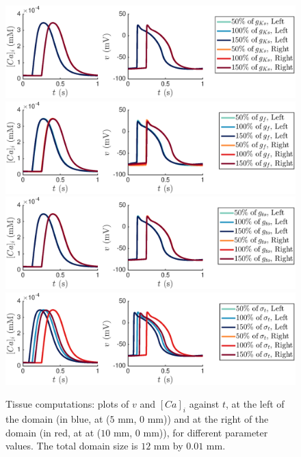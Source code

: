 \documentclass{article}
\begin{document}
%
\begin{figure}
   \includegraphics[trim=3cm 0cm 4cm 0cm, clip=true, width=1\linewidth]{strip_gks} 
   \includegraphics[trim=3cm 0cm 4cm 0cm, clip=true, width=1\linewidth]{strip_gf} 
      \includegraphics[trim=3cm 0cm 4cm 0cm, clip=true, width=1\linewidth]{strip_gto} 
         \includegraphics[trim=3cm 0cm 4cm 0cm, clip=true, width=1\linewidth]{strip_sigmat} 
    \caption{Tissue computations: plots of $v$ and $[Ca]_i$ against $t$, at the left of the domain (in blue, at ($5$ mm, $0$ mm)) and at the right of the domain (in red, at at ($10$ mm, $0$ mm)), for different parameter values. The total domain size is $12$ mm by $0.01$ mm.}
    \label{fig:5}
\end{figure}
%
\end{document}
